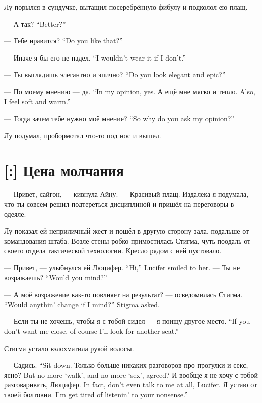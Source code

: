 Лу порылся в сундучке, вытащил посеребрённую фибулу и подколол ею плащ.

{--- А так?}
{``Better?''}

{--- Тебе нравится?}
{``Do you like that?''}

{--- Иначе я бы его не надел.}
{``I wouldn't wear it if I don't.''}

{--- Ты выглядишь элегантно и эпично?}
{``Do you look elegant and epic?''}

{--- По моему мнению --- да.}
{``In my opinion, yes.}
{А ещё мне мягко и тепло.}
{Also, I feel soft and warm.''}

{--- Тогда зачем тебе нужно моё мнение?}
{``So why do you ask my opinion?''}

Лу подумал, пробормотал что-то под нос и вышел.

\section{[:] Цена молчания}

--- Привет, сайгон, --- кивнула Айну.
--- Красивый плащ.
Издалека я подумала, что ты совсем решил подтереться дисциплиной и пришёл на переговоры в одеяле.

Лу показал ей неприличный жест и пошёл в другую сторону зала, подальше от командования штаба.
Возле стены робко примостилась Стигма, чуть поодаль от своего отдела тактической технологии.
Кресло рядом с ней пустовало.

{--- Привет, --- улыбнулся ей Люцифер.}
{``Hi,'' Lucifer smiled to her.}
{--- Ты не возражаешь?}
{``Would you mind?''}

{--- А моё возражение как-то повлияет на результат? --- осведомилась Стигма.}
{``Would anythin' change if I mind?'' Stigma asked.}

{--- Если ты не хочешь, чтобы я с тобой сидел --- я поищу другое место.}
{``If you don't want me close, of course I'll look for another seat.''}

Стигма устало взлохматила рукой волосы.

{--- Садись.}
{``Sit down.}
{Только больше никаких разговоров про прогулки и секс, ясно?}
{But no more `walk', and no more `sex', agreed?}
{И вообще я не хочу с тобой разговаривать, Люцифер.}
{In fact, don't even talk to me at all, Lucifer.}
{Я устаю от твоей болтовни.}
{I'm get tired of listenin' to your nonsense.''}

